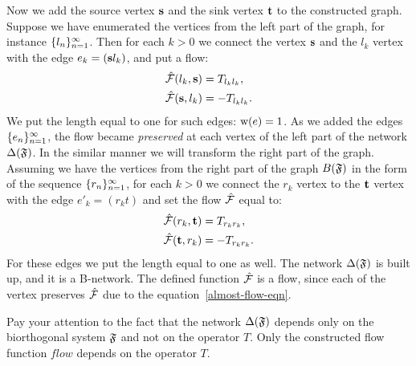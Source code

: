 \documentclass[12pt]{article}
\begin{document}
    Now we add the source vertex $\mathbf{s}$ and the sink vertex $\mathbf{t}$ to the constructed graph.
    Suppose we have enumerated the vertices from the left part of the graph, for instance $\{{l}_n\}_{n=1}^\infty$.
    Then for each $k > 0$ we connect the vertex $\mathbf{s}$ and the $l_k$ vertex with
      the edge $e_k = (\mathbf{s} l_k)$, and put a flow:
    \begin{align*}
      &\mathcal{\hat{F}}(l_k, \mathbf{s}) = T_{l_k l_k},\\
      &\mathcal{\hat{F}}(\mathbf{s}, l_k) = -T_{l_k l_k}.
    \end{align*}
    We put the length equal to one for such edges: $\mathrm{w}(e) = 1$.
    As we added the edges $\{{e}_n\}_{n=1}^\infty$, the flow became \emph{preserved} at each vertex of the left part of the network $\Delta(\mathfrak{F})$.
    In the similar manner we will transform the right part of the graph.
    Assuming we have the vertices from the right part of the graph $B(\mathfrak{F})$ in the form of the sequence $\{{r}_n\}_{n=1}^\infty$,
      for each $k > 0$ we connect the $r_k$ vertex to the $\mathbf{t}$ vertex with the edge $e'_k=(r_k t)$
      and set the flow $\mathcal{\hat{F}}$ equal to:
    \begin{align*}
      &\mathcal{\hat{F}}(r_k, \mathbf{t}) = T_{r_k r_k},\\
      &\mathcal{\hat{F}}(\mathbf{t}, r_k) = -T_{r_k r_k}.
    \end{align*}
    For these edges we put the length equal to one as well.
    The network $\Delta(\mathfrak{F})$ is built up, and it is a B-network.
    The defined function $\mathcal{\hat{F}}$ is a flow, since each of the vertex preserves
      $\mathcal{\hat{F}}$ due to the equation~\eqref{almost-flow-eqn}.
    \begin{remark}
      Pay your attention to the fact that the network $\Delta(\mathfrak{F})$
        depends only on the biorthogonal system $\mathfrak{F}$ and not on the operator $T$.
      Only the constructed flow function $flow$ depends on the operator $T$.
    \end{remark}
\end{document}
